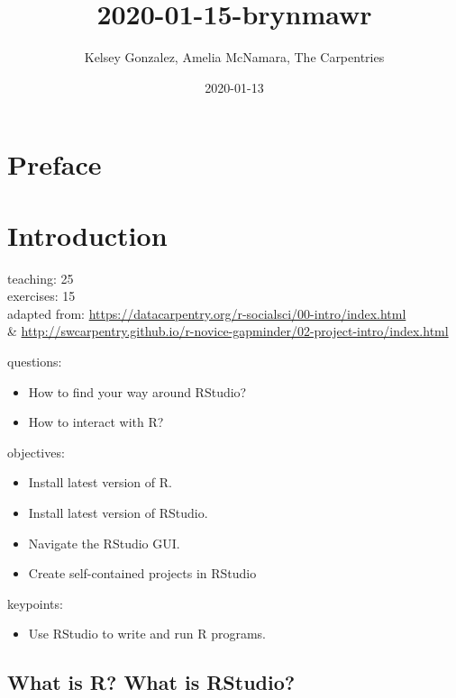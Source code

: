 \documentclass[]{book}
\title{2020-01-15-brynmawr}
\author{Kelsey Gonzalez, Amelia McNamara, The Carpentries}
\date{2020-01-13}
\providecommand{\tightlist}{%
  \setlength{\itemsep}{0pt}\setlength{\parskip}{0pt}}
\begin{document}
\maketitle

{
\setcounter{tocdepth}{1}
\tableofcontents
}
\chapter*{Preface}\label{preface}

\chapter{Introduction}\label{intro}

teaching: 25\\
exercises: 15\\
adapted from:
\url{https://datacarpentry.org/r-socialsci/00-intro/index.html}\\
\&
\url{http://swcarpentry.github.io/r-novice-gapminder/02-project-intro/index.html}

questions:

\begin{itemize}
\tightlist
\item
  How to find your way around RStudio?\\
\item
  How to interact with R?
\end{itemize}

objectives:

\begin{itemize}
\tightlist
\item
  Install latest version of R.\\
\item
  Install latest version of RStudio.\\
\item
  Navigate the RStudio GUI.
\item
  Create self-contained projects in RStudio
\end{itemize}

keypoints:

\begin{itemize}
\tightlist
\item
  Use RStudio to write and run R programs.
\end{itemize}

\section{What is R? What is RStudio?}\label{what-is-r-what-is-rstudio}
\end{document}
